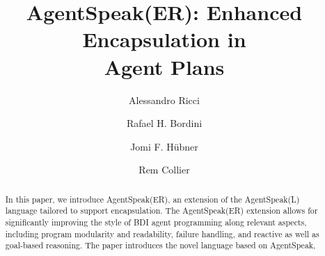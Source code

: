 \documentclass{llncs}
\begin{document}
\title{AgentSpeak(ER): Enhanced Encapsulation in \\Agent Plans}




\author{Alessandro Ricci \and Rafael H. Bordini \and  Jomi F. H\"ubner \and Rem Collier}


\maketitle

\begin{abstract}  
  In this paper, we introduce AgentSpeak(ER), an extension of the
  AgentSpeak(L) language tailored to support encapsulation. The
  AgentSpeak(ER) extension allows for significantly improving the
  style of BDI agent programming along relevant aspects, including
  program modularity and readability, failure handling, and reactive
  as well as goal-based reasoning. The paper introduces the novel
  language based on AgentSpeak, %
\end{abstract}








% 








\end{document}
